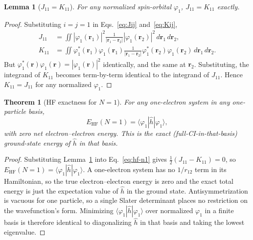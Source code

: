 \documentclass[11pt]{report}
\newtheorem{theorem}{Theorem}
\newtheorem{lemma}{Lemma}
\theoremstyle{definition}
\theoremstyle{remark}
\newcommand{\EHF}{E_{\mathrm{HF}}}
\begin{document}
\begin{lemma}[$J_{11} = K_{11}$]
\label{lem:J11}
For any normalized spin-orbital $\varphi_1$, $J_{11} = K_{11}$ exactly.
\end{lemma}

\begin{proof}
Substituting $i=j=1$ in Eqs.~\eqref{eq:Jij} and~\eqref{eq:Kij},
\begin{align}
J_{11} &= \iint |\varphi_1(\mathbf r_1)|^2
                \frac{1}{|\mathbf r_1 - \mathbf r_2|}
                |\varphi_1(\mathbf r_2)|^2 \, d\mathbf r_1 \, d\mathbf r_2,\\
K_{11} &= \iint \varphi_1^*(\mathbf r_1) \varphi_1(\mathbf r_1)
                \frac{1}{|\mathbf r_1 - \mathbf r_2|}
                \varphi_1^*(\mathbf r_2) \varphi_1(\mathbf r_2)
                \, d\mathbf r_1 \, d\mathbf r_2.
\end{align}
But $\varphi_1^*(\mathbf r) \varphi_1(\mathbf r) = |\varphi_1(\mathbf r)|^2$
identically, and the same at $\mathbf r_2$. Substituting, the integrand of
$K_{11}$ becomes term-by-term identical to the integrand of $J_{11}$.
Hence $K_{11} = J_{11}$ for any normalized $\varphi_1$.
\end{proof}

\begin{theorem}[HF exactness for $N=1$]
\label{thm:hf-exact}
For any one-electron system in any one-particle basis,
\begin{equation}
\EHF(N{=}1) = \langle \varphi_1 | \hat h | \varphi_1 \rangle,
\end{equation}
with zero net electron--electron energy. This is the exact
(full-CI-in-that-basis) ground-state energy of $\hat h$ in that basis.
\end{theorem}

\begin{proof}
Substituting Lemma~\ref{lem:J11} into Eq.~\eqref{eq:hf-n1} gives
$\tfrac12 (J_{11} - K_{11}) = 0$, so
$\EHF(N{=}1) = \langle \varphi_1 | \hat h | \varphi_1 \rangle$.
A one-electron system has no $1/r_{12}$ term in its Hamiltonian, so the
true electron--electron energy is zero and the exact total energy is just
the expectation value of $\hat h$ in the ground state. Antisymmetrization
is vacuous for one particle, so a single Slater determinant places no
restriction on the wavefunction's form. Minimizing $\langle \varphi_1 |
\hat h | \varphi_1 \rangle$ over normalized $\varphi_1$ in a finite basis
is therefore identical to diagonalizing $\hat h$ in that basis and taking
the lowest eigenvalue.
\end{proof}
\end{document}
